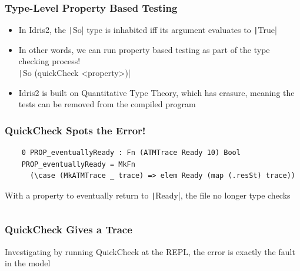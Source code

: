\documentclass[compress]{beamer}
\begin{document}
\begin{frame}[fragile]
  \frametitle{Type-Level Property Based Testing}

  \large

  \begin{itemize}
    \item<1-> In Idris2, the \texttt|So| type is inhabited iff its
              argument evaluates to \texttt|True|
    \item<2-> In other words, we can run property based testing as part of the
              type checking process!\\
              \texttt|So (quickCheck <property>)|
    \item<3-> Idris2 is built on Quantitative Type Theory, which has erasure,
              meaning the tests can be removed from the compiled program
  \end{itemize}

\end{frame}


\begin{frame}[fragile]
  \frametitle{QuickCheck Spots the Error!}

  \large

  \begin{verbatim}
    0 PROP_eventuallyReady : Fn (ATMTrace Ready 10) Bool
    PROP_eventuallyReady = MkFn
      (\case (MkATMTrace _ trace) => elem Ready (map (.resSt) trace))
  \end{verbatim}

  \pause

  With a property to eventually return to \texttt|Ready|, the file no
  longer type checks

  \pause

  \inputminted[fontsize=\normalsize]{Idris}{qc-things/ATM-qc-error.idr}

\end{frame}


\begin{frame}[fragile]
  \frametitle{QuickCheck Gives a Trace}

  \large

  Investigating by running QuickCheck at the REPL, the error is exactly the
  fault in the model

  \pause

  \inputminted[fontsize=\small]{Idris}{qc-things/qc-trace-4.idr}

\end{frame}
\end{document}
